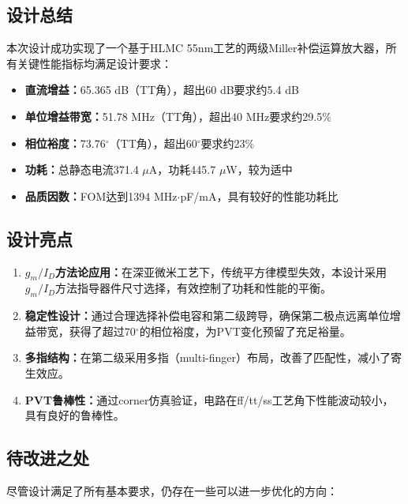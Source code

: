 \documentclass[UTF8,12pt,a4paper]{ctexart}
\begin{document}
\subsection{设计总结}

本次设计成功实现了一个基于HLMC 55nm工艺的两级Miller补偿运算放大器，所有关键性能指标均满足设计要求：

\begin{itemize}
    \item \textbf{直流增益：}65.365 dB（TT角），超出60 dB要求约5.4 dB
    \item \textbf{单位增益带宽：}51.78 MHz（TT角），超出40 MHz要求约29.5\%
    \item \textbf{相位裕度：}73.76$^\circ$（TT角），超出60$^\circ$要求约23\%
    \item \textbf{功耗：}总静态电流371.4 $\mu$A，功耗445.7 $\mu$W，较为适中
    \item \textbf{品质因数：}FOM达到1394 MHz$\cdot$pF/mA，具有较好的性能功耗比
\end{itemize}

\subsection{设计亮点}

\begin{enumerate}
    \item \textbf{$g_m/I_D$方法论应用：}在深亚微米工艺下，传统平方律模型失效，本设计采用$g_m/I_D$方法指导器件尺寸选择，有效控制了功耗和性能的平衡。
    
    \item \textbf{稳定性设计：}通过合理选择补偿电容和第二级跨导，确保第二极点远离单位增益带宽，获得了超过70$^\circ$的相位裕度，为PVT变化预留了充足裕量。
    
    \item \textbf{多指结构：}在第二级采用多指（multi-finger）布局，改善了匹配性，减小了寄生效应。
    
    \item \textbf{PVT鲁棒性：}通过corner仿真验证，电路在ff/tt/ss工艺角下性能波动较小，具有良好的鲁棒性。
\end{enumerate}

\subsection{待改进之处}

尽管设计满足了所有基本要求，仍存在一些可以进一步优化的方向：
\end{document}
